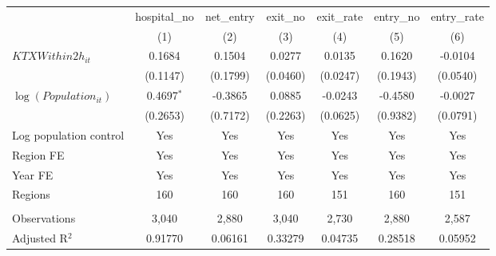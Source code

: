 \begingroup
\centering
\begin{tabular}{lcccccc}
   \toprule
                            & hospital\_no  & net\_entry  & exit\_no  & exit\_rate  & entry\_no  & entry\_rate \\    
                            & (1)           & (2)         & (3)       & (4)         & (5)        & (6)\\  
   \midrule 
   $KTXWithin2h_{it}$       & 0.1684        & 0.1504      & 0.0277    & 0.0135      & 0.1620     & -0.0104\\   
                            & (0.1147)      & (0.1799)    & (0.0460)  & (0.0247)    & (0.1943)   & (0.0540)\\   
   $\log(Population_{it})$  & 0.4697$^{*}$  & -0.3865     & 0.0885    & -0.0243     & -0.4580    & -0.0027\\   
                            & (0.2653)      & (0.7172)    & (0.2263)  & (0.0625)    & (0.9382)   & (0.0791)\\   
   Log population control   & Yes           & Yes         & Yes       & Yes         & Yes        & Yes\\  
   Region FE                & Yes           & Yes         & Yes       & Yes         & Yes        & Yes\\  
   Year FE                  & Yes           & Yes         & Yes       & Yes         & Yes        & Yes\\  
   Regions                  & 160           & 160         & 160       & 151         & 160        & 151\\  
    \\
   Observations             & 3,040         & 2,880       & 3,040     & 2,730       & 2,880      & 2,587\\  
   Adjusted R$^2$           & 0.91770       & 0.06161     & 0.33279   & 0.04735     & 0.28518    & 0.05952\\  
   \bottomrule
\end{tabular}
\par\endgroup
